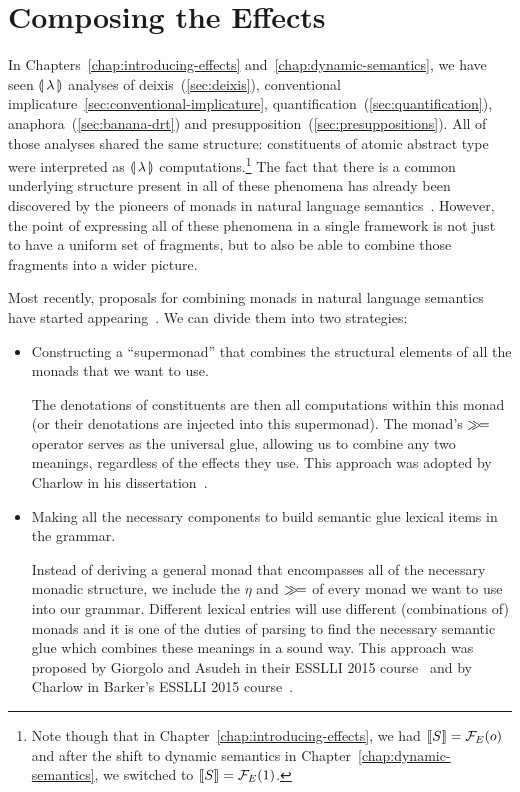 \chapter{Composing the Effects}
\label{chap:composing-effects}

In Chapters~\ref{chap:introducing-effects}
and~\ref{chap:dynamic-semantics}, we have seen ${\llparenthesis \, \lambda \, \rrparenthesis}$ analyses of
deixis~(\ref{sec:deixis}), conventional
implicature~\ref{sec:conventional-implicature},
quantification~(\ref{sec:quantification}), anaphora~(\ref{sec:banana-drt})
and presupposition~(\ref{sec:presuppositions}). All of those analyses
shared the same structure: constituents of atomic abstract type were
interpreted as ${\llparenthesis \, \lambda \, \rrparenthesis}$ computations.\footnote{Note though that in
  Chapter~\ref{chap:introducing-effects}, we had $\llbracket S \rrbracket = \mathcal{F}_E(o)$ and
  after the shift to dynamic semantics in
  Chapter~\ref{chap:dynamic-semantics}, we switched to
  $\llbracket S \rrbracket = \mathcal{F}_E(1)$.} The fact that there is a common underlying
structure present in all of these phenomena has already been discovered by
the pioneers of monads in natural language
semantics~\cite{shan2002monads,charlow2014semantics,giorgolo2015natural,barker2015monads}. However,
the point of expressing all of these phenomena in a single framework is not
just to have a uniform set of fragments, but to also be able to combine
those fragments into a wider picture.

Most recently, proposals for combining monads in natural language semantics
have started
appearing~\cite{charlow2014semantics,giorgolo2015natural,barker2015monads}. We
can divide them into two strategies:

\begin{itemize}
\item Constructing a ``supermonad'' that combines the structural elements
  of all the monads that we want to use.

  The denotations of constituents are then all computations within this
  monad (or their denotations are injected into this supermonad). The
  monad's $\mathbin{\gg\!=}$ operator serves as the universal glue, allowing us to
  combine any two meanings, regardless of the effects they use. This
  approach was adopted by Charlow in his
  dissertation~\cite{charlow2014semantics}.
\item Making all the necessary components to build semantic glue lexical
  items in the grammar.

  Instead of deriving a general monad that encompasses all of the necessary
  monadic structure, we include the $\eta$ and $\mathbin{\gg\!=}$ of every monad we
  want to use into our grammar. Different lexical entries will use
  different (combinations of) monads and it is one of the duties of parsing
  to find the necessary semantic glue which combines these meanings in a
  sound way. This approach was proposed by Giorgolo and Asudeh in their
  ESSLLI 2015 course~\cite{giorgolo2015natural} and by Charlow in Barker's
  ESSLLI 2015 course~\cite{barker2015monads,charlow2015monads}.
\end{itemize}

